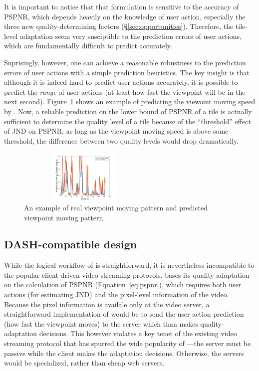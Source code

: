 It is important to notice that that formulation is sensitive to the accuracy of PSPNR, which depends heavily on the knowledge of user action, especially the three new quality-determining factors (\S\ref{sec:opportunities}).
Therefore, the tile-level adaptation seem very susciptible to the prediction errors of user actions, which are fundamentally difficult to predict accurately.

Suprisingly, however, one can achieve a reasonable robustness to the prediction errors of user actions with a simple prediction heuristics. 
The key insight is that although it is indeed hard to predict user actions accurately, it is possible to predict the {\em range} of user actions (\eg at least how fast the viewpoint will be in the next second). 
Figure~\ref{speed_analysis} shows an example of predicting the viewoint moving speed by \fillme.  
Now, a reliable prediction on the lower bound of PSPNR of a tile is actually sufficient to determine the quality level of a tile because of the ``threshold'' effect of JND on PSPNR; \eg as long as the viewpoint moving speed is above some threshold, the difference between two quality levels would drop dramatically.

\begin{figure}
  \centering
  \includegraphics[width=2.5in, height=1in]{images/speed_analysis.pdf}
  \caption{An example of real viewpoint moving pattern and predicted viewpoint moving pattern.}
  \label{speed_analysis}
  \end{figure}


\subsection{DASH-compatible design}
\label{subsec:compatible}

While the logical workflow of \name is straightforward, it is nevertheless incompatible to the popular client-driven video streaming protocols.
\name bases its quality adaptation on the calculation of PSPNR (Equation~\ref{eq:pspnr}), which requires both user actions (for estimating JND) and the pixel-level information of the video. 
Because the pixel information is availale only at the video server, a straightforward implementation of \name would be to send the user action prediction (\eg how fast the viewpoint moves) to the server which than makes quality-adaptation decisions. 
This however violates a key tenet of the existing video streaming protocol that has spurred the wide popularity of \vrvideos---the server must be passive while the client makes the adaptation decisions. Otherwise, the servers would be specialized, rather than cheap web servers.

